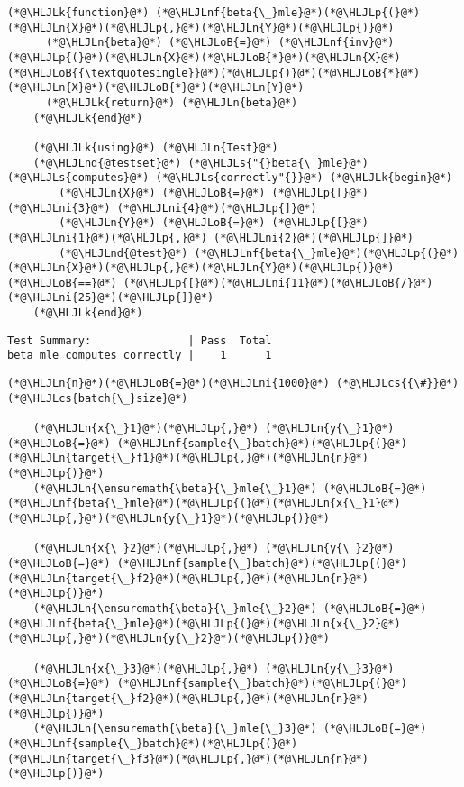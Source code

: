 \documentclass[12pt,a4paper]{article}
\newcommand{\HLJLk}[1]{\textcolor[RGB]{148,91,176}{\textbf{#1}}}
\newcommand{\HLJLn}[1]{#1}
\newcommand{\HLJLnd}[1]{\textcolor[RGB]{214,102,97}{#1}}
\newcommand{\HLJLnf}[1]{\textcolor[RGB]{66,102,213}{#1}}
\newcommand{\HLJLs}[1]{\textcolor[RGB]{201,61,57}{#1}}
\newcommand{\HLJLni}[1]{\textcolor[RGB]{59,151,46}{#1}}
\newcommand{\HLJLoB}[1]{\textcolor[RGB]{102,102,102}{\textbf{#1}}}
\newcommand{\HLJLp}[1]{#1}
\newcommand{\HLJLcs}[1]{\textcolor[RGB]{153,153,119}{\textit{#1}}}
\begin{document}
\begin{lstlisting}
(*@\HLJLk{function}@*) (*@\HLJLnf{beta{\_}mle}@*)(*@\HLJLp{(}@*)(*@\HLJLn{X}@*)(*@\HLJLp{,}@*)(*@\HLJLn{Y}@*)(*@\HLJLp{)}@*)
      (*@\HLJLn{beta}@*) (*@\HLJLoB{=}@*) (*@\HLJLnf{inv}@*)(*@\HLJLp{(}@*)(*@\HLJLn{X}@*)(*@\HLJLoB{*}@*)(*@\HLJLn{X}@*)(*@\HLJLoB{{\textquotesingle}}@*)(*@\HLJLp{)}@*)(*@\HLJLoB{*}@*)(*@\HLJLn{X}@*)(*@\HLJLoB{*}@*)(*@\HLJLn{Y}@*)
      (*@\HLJLk{return}@*) (*@\HLJLn{beta}@*)
    (*@\HLJLk{end}@*)

    (*@\HLJLk{using}@*) (*@\HLJLn{Test}@*)
    (*@\HLJLnd{@testset}@*) (*@\HLJLs{"{}beta{\_}mle}@*) (*@\HLJLs{computes}@*) (*@\HLJLs{correctly"{}}@*) (*@\HLJLk{begin}@*)
        (*@\HLJLn{X}@*) (*@\HLJLoB{=}@*) (*@\HLJLp{[}@*)(*@\HLJLni{3}@*) (*@\HLJLni{4}@*)(*@\HLJLp{]}@*)
        (*@\HLJLn{Y}@*) (*@\HLJLoB{=}@*) (*@\HLJLp{[}@*)(*@\HLJLni{1}@*)(*@\HLJLp{,}@*) (*@\HLJLni{2}@*)(*@\HLJLp{]}@*)
        (*@\HLJLnd{@test}@*) (*@\HLJLnf{beta{\_}mle}@*)(*@\HLJLp{(}@*)(*@\HLJLn{X}@*)(*@\HLJLp{,}@*)(*@\HLJLn{Y}@*)(*@\HLJLp{)}@*) (*@\HLJLoB{==}@*) (*@\HLJLp{[}@*)(*@\HLJLni{11}@*)(*@\HLJLoB{/}@*)(*@\HLJLni{25}@*)(*@\HLJLp{]}@*)
    (*@\HLJLk{end}@*)
\end{lstlisting}

\begin{lstlisting}
Test Summary:               | Pass  Total
beta_mle computes correctly |    1      1
\end{lstlisting}


\begin{lstlisting}
(*@\HLJLn{n}@*)(*@\HLJLoB{=}@*)(*@\HLJLni{1000}@*) (*@\HLJLcs{{\#}}@*) (*@\HLJLcs{batch{\_}size}@*)

    (*@\HLJLn{x{\_}1}@*)(*@\HLJLp{,}@*) (*@\HLJLn{y{\_}1}@*) (*@\HLJLoB{=}@*) (*@\HLJLnf{sample{\_}batch}@*)(*@\HLJLp{(}@*)(*@\HLJLn{target{\_}f1}@*)(*@\HLJLp{,}@*)(*@\HLJLn{n}@*)(*@\HLJLp{)}@*)
    (*@\HLJLn{\ensuremath{\beta}{\_}mle{\_}1}@*) (*@\HLJLoB{=}@*) (*@\HLJLnf{beta{\_}mle}@*)(*@\HLJLp{(}@*)(*@\HLJLn{x{\_}1}@*)(*@\HLJLp{,}@*)(*@\HLJLn{y{\_}1}@*)(*@\HLJLp{)}@*)

    (*@\HLJLn{x{\_}2}@*)(*@\HLJLp{,}@*) (*@\HLJLn{y{\_}2}@*) (*@\HLJLoB{=}@*) (*@\HLJLnf{sample{\_}batch}@*)(*@\HLJLp{(}@*)(*@\HLJLn{target{\_}f2}@*)(*@\HLJLp{,}@*)(*@\HLJLn{n}@*)(*@\HLJLp{)}@*)
    (*@\HLJLn{\ensuremath{\beta}{\_}mle{\_}2}@*) (*@\HLJLoB{=}@*) (*@\HLJLnf{beta{\_}mle}@*)(*@\HLJLp{(}@*)(*@\HLJLn{x{\_}2}@*)(*@\HLJLp{,}@*)(*@\HLJLn{y{\_}2}@*)(*@\HLJLp{)}@*)

    (*@\HLJLn{x{\_}3}@*)(*@\HLJLp{,}@*) (*@\HLJLn{y{\_}3}@*) (*@\HLJLoB{=}@*) (*@\HLJLnf{sample{\_}batch}@*)(*@\HLJLp{(}@*)(*@\HLJLn{target{\_}f2}@*)(*@\HLJLp{,}@*)(*@\HLJLn{n}@*)(*@\HLJLp{)}@*)
    (*@\HLJLn{\ensuremath{\beta}{\_}mle{\_}3}@*) (*@\HLJLoB{=}@*) (*@\HLJLnf{sample{\_}batch}@*)(*@\HLJLp{(}@*)(*@\HLJLn{target{\_}f3}@*)(*@\HLJLp{,}@*)(*@\HLJLn{n}@*)(*@\HLJLp{)}@*)
\end{lstlisting}
\end{document}
